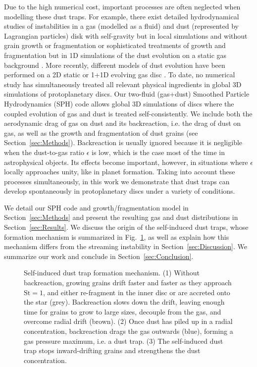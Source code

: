 \documentclass[a4paper,fleqn,usenatbib]{mnras}
\newcommand{\St}{\mathrm{St}}         %
\begin{document}
Due to the high numerical cost, important processes are often neglected when modelling these dust traps. For example, there exist detailed hydrodynamical studies of instabilities in a gas (modelled as a fluid) and dust (represented by Lagrangian particles) disk with self-gravity but in local simulations and without grain growth or fragmentation \citep{Johansen2007} or sophisticated treatments of growth and fragmentation but in 1D simulations of the dust evolution on a static gas background \citep{Birnstiel2010}. More recently, different models of dust evolution have been performed on a 2D static \citep{Drazkowska2013} or 1+1D evolving gas disc \citep{Drazkowska2016}. To date, no numerical study has simultaneously treated all relevant physical ingredients in global 3D simulations of protoplanetary discs. Our two-fluid (gas+dust) Smoothed Particle Hydrodynamics (SPH) code allows global 3D simulations of discs where the coupled evolution of gas and dust is treated self-consistently. We include both the aerodynamic drag of gas on dust and its backreaction, i.e. the drag of dust on gas, as well as the growth and fragmentation of dust grains (see Section~\ref{sec:Methods}). Backreaction is usually ignored because it is negligible when the dust-to-gas ratio $\epsilon$ is low, which is the case most of the time in astrophysical objects. Its effects become important, however, in situations where $\epsilon$ locally approaches unity, like in planet formation. Taking into account these processes simultaneously, in this work we demonstrate that dust traps can develop spontaneously in protoplanetary discs under a variety of conditions.

We detail our SPH code and growth/fragmentation model in Section~\ref{sec:Methods} and present the resulting gas and dust distributions in Section~\ref{sec:Results}. We discuss the origin of the self-induced dust traps, whose formation mechanism is summarized in Fig.~\ref{Fig:sketch}, as well as explain how this mechanism differs from the streaming instability in Section~\ref{sec:Discussion}. We summarize our work and conclude in Section~\ref{sec:Conclusion}.

\begin{figure}
\centering
{}
\caption{Self-induced dust trap formation mechanism. (1) Without backreaction, growing grains drift faster and faster as they approach $\St=1$, and either re-fragment in the inner disc or are accreted onto the star (grey). Backreaction slows down the drift, leaving enough time for grains to grow to large sizes, decouple from the gas, and overcome radial drift (brown). (2) Once dust has piled up in a radial concentration, backreaction drags the gas outwards (blue), forming a gas pressure maximum, i.e. a dust trap. (3) The self-induced dust trap stops inward-drifting grains and strengthens the dust concentration.}
\label{Fig:sketch}
\end{figure}
\end{document}
